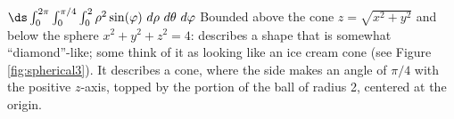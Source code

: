 {
$\ds \int_0^{2\pi}\int_0^{\pi/4}\int_0^{2} \rho^2\sin(\varphi)\ d\rho\ d\theta\ d\varphi$
}
{Bounded above the cone $z=\sqrt{x^2+y^2}$ and below the sphere $x^2+y^2+z^2=4$: describes a shape that is somewhat ``diamond''-like; some think of it as looking like an ice cream cone (see Figure \ref{fig:spherical3}). It describes a cone, where the side makes an angle of $\pi/4$ with the positive $z$-axis, topped by the portion of the ball of radius 2, centered at the origin. 
}
